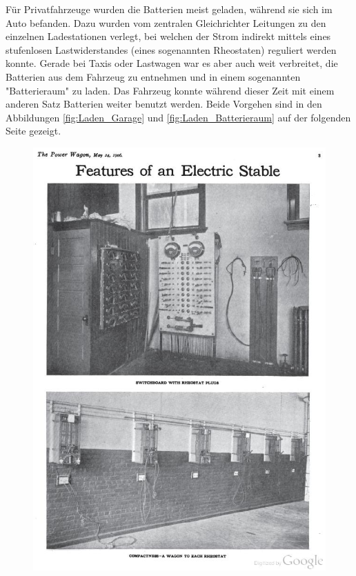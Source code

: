 Für Privatfahrzeuge wurden die Batterien meist geladen, während sie sich im Auto befanden. Dazu wurden vom zentralen Gleichrichter Leitungen zu den einzelnen Ladestationen verlegt, bei welchen der Strom indirekt mittels eines stufenlosen Lastwiderstandes (eines sogenannten Rheostaten) reguliert werden konnte. Gerade bei Taxis oder Lastwagen war es aber auch weit verbreitet, die Batterien aus dem Fahrzeug zu entnehmen und in einem sogenannten "Batterieraum" zu laden. Das Fahrzeug konnte während dieser Zeit mit einem anderen Satz Batterien weiter benutzt werden. Beide Vorgehen sind in den Abbildungen \ref{fig:Laden_Garage} und \ref{fig:Laden_Batterieraum} auf der folgenden Seite gezeigt.

\begin{landscape}
\begin{figure}
\begin{minipage}{0.65\textwidth}
	\includegraphics[width=\textwidth]{images/Laden_Garage.jpg}

\end{minipage}
\end{figure}
\end{landscape}
